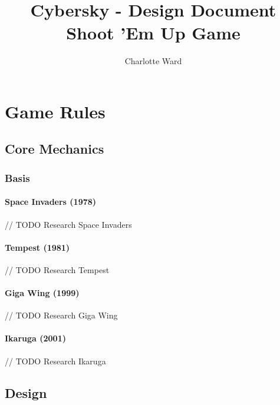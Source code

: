 \documentclass{scrreprt}
\begin{document}
\author{Charlotte Ward}
\title{
{\huge Cybersky - Design Document} \\
{\small Shoot 'Em Up Game}
}
\maketitle

\chapter{Game Rules}

\section{Core Mechanics}

\subsection{Basis}

\subsubsection{Space Invaders (1978)}

// TODO Research Space Invaders

\subsubsection{Tempest (1981)}

// TODO Research Tempest

\subsubsection{Giga Wing (1999)}

// TODO Research Giga Wing

\subsubsection{Ikaruga (2001)}

// TODO Research Ikaruga

\section{Design}

\paragraph{}
\end{document}
